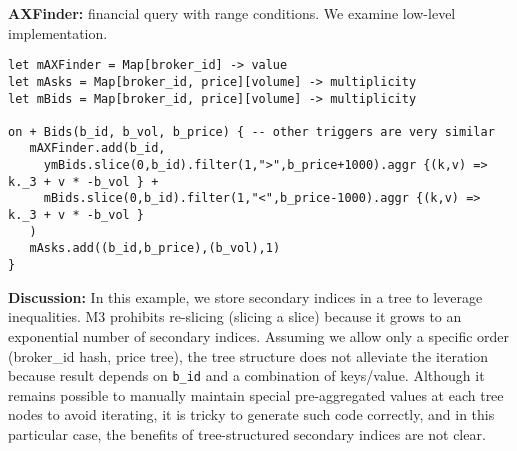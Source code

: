 \documentclass[11pt]{article}
\newlength{\dlen}
\def\discuss#1{\par\hspace{2em}
\setlength{\dlen}{\textwidth}
\addtolength{\dlen}{-2em}
\begin{minipage}{\dlen}\footnotesize {\bf\color{red} Discussion:} #1\end{minipage}\par}
\begin{document}
\textbf{AXFinder:} financial query with range conditions. We examine low-level implementation.
\begin{verbatim}
let mAXFinder = Map[broker_id] -> value
let mAsks = Map[broker_id, price][volume] -> multiplicity
let mBids = Map[broker_id, price][volume] -> multiplicity

on + Bids(b_id, b_vol, b_price) { -- other triggers are very similar
   mAXFinder.add(b_id, 
     ymBids.slice(0,b_id).filter(1,">",b_price+1000).aggr {(k,v) =>  k._3 + v * -b_vol } +
     mBids.slice(0,b_id).filter(1,"<",b_price-1000).aggr {(k,v) =>  k._3 + v * -b_vol }
   )
   mAsks.add((b_id,b_price),(b_vol),1)
}
\end{verbatim}
\discuss{In this example, we store secondary indices in a tree to leverage inequalities. M3 prohibits re-slicing (slicing a slice) because it grows to an exponential number of secondary indices. Assuming we allow only a specific order (broker\_id hash, price tree), the tree structure does not alleviate the iteration because result depends on {\tt b\_id} and a combination of keys/value. Although it remains possible to manually maintain special pre-aggregated values at each tree nodes to avoid iterating, it is tricky to generate such code correctly, and in this particular case, the benefits of tree-structured secondary indices are not clear.}


\end{document}
